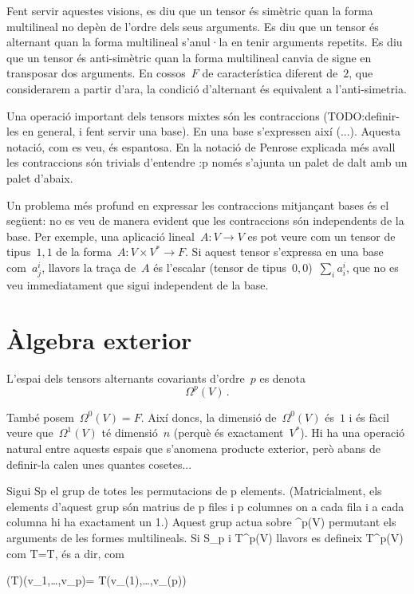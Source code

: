 Fent servir aquestes visions, es diu que un tensor és simètric quan
la forma multilineal no depèn de l'ordre dels seus arguments. Es diu
que un tensor és alternant quan la forma multilineal s'anul·la en
tenir arguments repetits. Es diu que un tensor és anti-simètric quan
la forma multilineal canvia de signe en transposar dos arguments. En
cossos~$F$ de característica diferent de~$2$, que considerarem a partir
d'ara, la condició d'alternant és equivalent a l'anti-simetria.

Una operació important dels tensors mixtes són les contraccions
(TODO:definir-les en general, i fent servir una base). En una base
s'expressen així (...). Aquesta notació, com es veu, és espantosa. En
la notació de Penrose explicada més avall les contraccions són
trivials d'entendre :p només s'ajunta un palet de dalt amb un palet
d'abaix.

Un problema més profund en expressar les contraccions mitjançant
bases és el següent: no es veu de manera evident que les contraccions
són independents de la base. Per exemple, una aplicació
lineal~$A:V\to V$ es pot veure com un tensor de tipus~$1,1$ de la
forma~$A:V\times V^*\to F$. Si aquest tensor s'expressa en una base
com~$a^i_j$, llavors la traça de~$A$ és l'escalar (tensor de
tipus~$0,0$)~$\sum_ia^i_i$, que no es veu immediatament que sigui
independent de la base.


\section{Àlgebra exterior}

L'espai dels tensors alternants covariants d'ordre~$p$ es denota
\[
	Ω^p(V) \, .
\]


També posem~$Ω^0(V) = F$.  Així doncs, la dimensió de~$Ω^0(V)$ és~$1$
i és fàcil veure que~$Ω^1(V)$ té dimensió~$n$ (perquè és
exactament~$V^*$). Hi ha una operació natural entre aquests espais
que s'anomena producte exterior, però abans de definir-la calen unes
quantes cosetes...

Sigui Sp el grup de totes les permutacions de p elements. (Matricialment, els elements d'aquest grup són matrius de p files i p columnes on a cada fila i a cada columna hi ha exactament un 1.) Aquest grup actua sobre ^p(V) permutant els arguments de les formes multilineals. Si \sigma\in S_p i T\in{}^p(V) llavors es defineix \sigma T\in{}^p(V) com \sigma T=T\circ\sigma, és a dir, com

    (\sigma T)(v_1,\dots,v_p)= T(v_{\sigma(1)},\dots,v_{\sigma(p)}) 

